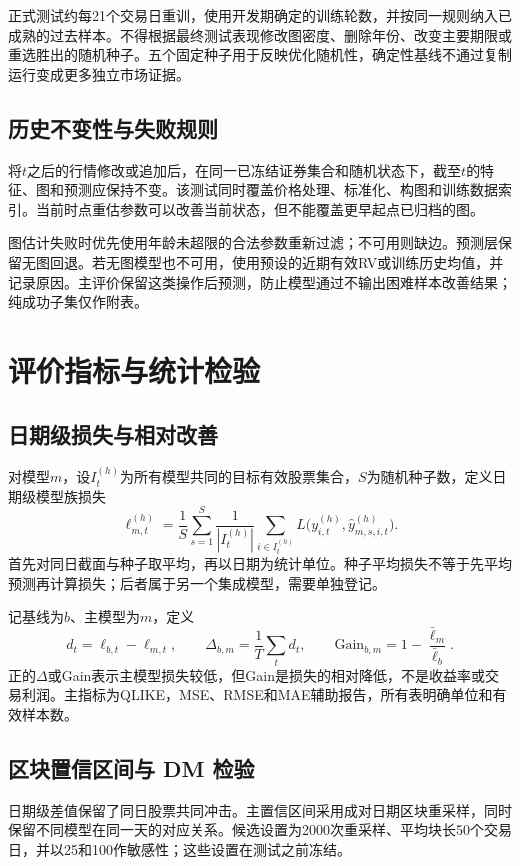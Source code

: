 正式测试约每21个交易日重训，使用开发期确定的训练轮数，并按同一规则纳入已成熟的过去样本。不得根据最终测试表现修改图密度、删除年份、改变主要期限或重选胜出的随机种子。五个固定种子用于反映优化随机性，确定性基线不通过复制运行变成更多独立市场证据。

\subsection{历史不变性与失败规则}
将$t$之后的行情修改或追加后，在同一已冻结证券集合和随机状态下，截至$t$的特征、图和预测应保持不变。该测试同时覆盖价格处理、标准化、构图和训练数据索引。当前时点重估参数可以改善当前状态，但不能覆盖更早起点已归档的图。

图估计失败时优先使用年龄未超限的合法参数重新过滤；不可用则缺边。预测层保留无图回退。若无图模型也不可用，使用预设的近期有效RV或训练历史均值，并记录原因。主评价保留这类操作后预测，防止模型通过不输出困难样本改善结果；纯成功子集仅作附表。

\section{评价指标与统计检验}
\subsection{日期级损失与相对改善}
对模型$m$，设$I_t^{(h)}$为所有模型共同的目标有效股票集合，$S$为随机种子数，定义日期级模型族损失
\begin{equation}\label{eq:daily_loss}
\ell_{m,t}^{(h)}=\frac1S\sum_{s=1}^{S}\frac1{|I_t^{(h)}|}
\sum_{i\in I_t^{(h)}}L\big(y_{i,t}^{(h)},\widehat y_{m,s,i,t}^{(h)}\big).
\end{equation}
首先对同日截面与种子取平均，再以日期为统计单位。种子平均损失不等于先平均预测再计算损失；后者属于另一个集成模型，需要单独登记。

记基线为$b$、主模型为$m$，定义
\begin{equation}\label{eq:difference}
d_t=\ell_{b,t}-\ell_{m,t},\qquad
\Delta_{b,m}=\frac1T\sum_t d_t,\qquad
\mathrm{Gain}_{b,m}=1-\frac{\bar\ell_m}{\bar\ell_b}.
\end{equation}
正的$\Delta$或Gain表示主模型损失较低，但Gain是损失的相对降低，不是收益率或交易利润。主指标为QLIKE，MSE、RMSE和MAE辅助报告，所有表明确单位和有效样本数。

\subsection{区块置信区间与 DM 检验}
日期级差值保留了同日股票共同冲击。主置信区间采用成对日期区块重采样，同时保留不同模型在同一天的对应关系。候选设置为2000次重采样、平均块长50个交易日，并以25和100作敏感性；这些设置在测试之前冻结。

